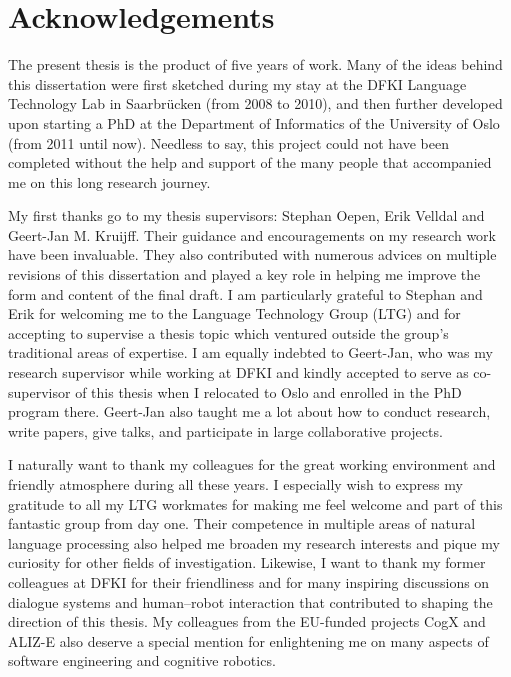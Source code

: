 \chapter*{Acknowledgements}

The present thesis is the product of five years of work. Many of the ideas behind this dissertation were first sketched during my stay at the DFKI Language Technology Lab in Saarbr\"ucken (from 2008 to 2010), and then further developed upon starting a PhD at the Department of Informatics of the University of Oslo (from 2011 until now).  Needless to say, this project could not have been completed without the help and support of the many people that accompanied me on this long research journey.

My first thanks go to my thesis supervisors: Stephan Oepen, Erik Velldal and Geert-Jan M. Kruijff.  Their guidance and encouragements on my research work have been invaluable.  They also contributed with numerous advices on multiple revisions of this dissertation and played a key role in helping me improve the form and content of the final draft. I am particularly grateful to Stephan and Erik for welcoming me to the Language Technology Group (LTG) and for accepting to supervise a thesis topic which ventured outside the group's traditional areas of expertise. I am equally indebted to Geert-Jan, who was my research supervisor while working at DFKI and kindly accepted to serve as co-supervisor of this thesis when I relocated to Oslo and enrolled in the PhD program there. Geert-Jan  also taught me a lot about how to conduct research, write papers, give talks, and participate in large collaborative projects.

I naturally want to thank my colleagues for the great working environment and friendly atmosphere during all these years.  I especially wish to express my gratitude to all my LTG workmates for making me feel welcome and part of this fantastic group from day one. Their competence in multiple areas of natural language processing also helped me broaden my research interests and pique my curiosity for other fields of investigation.  Likewise, I want to thank my former colleagues at DFKI for their friendliness and for many inspiring discussions on dialogue systems and human--robot interaction that contributed to shaping the direction of this thesis. My colleagues from the EU-funded projects CogX and ALIZ-E also deserve a special mention for enlightening me on many aspects of software engineering and cognitive robotics.

